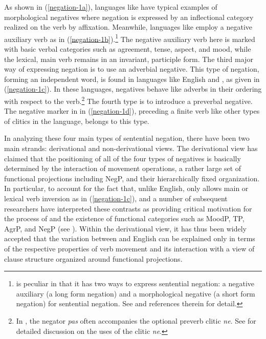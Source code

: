 \documentclass[output=paper
	        ,collection
	        ,collectionchapter
 	        ,biblatex
                ,babelshorthands
                ,newtxmath
                ,draftmode
                ,colorlinks, citecolor=brown
]{langscibook}
\begin{document}
\noindent
As shown in (\ref{negation-1a}), languages like 
have typical examples of morphological negatives where
negation is expressed by an inflectional category realized on the
verb by affixation. Meanwhile, languages like 
 employ a negative auxiliary verb as in (\ref{negation-1b}).\footnote{
 is peculiar in that it has two ways to
 express sentential negation: a negative auxiliary (a long form
 negation)  and a morphological negative (a short form negation)
 for sentential negation. See \citet{Kim:00,Kim:16} and references therein for detail.}
  The negative auxiliary
 verb here is marked with basic verbal categories such as agreement, tense, aspect, and mood, while the lexical, main verb remains in an invariant, participle form. The third major way of expressing negation is to use an adverbial
negative. This type of negation, forming an independent word, is found in
languages like English and , as given in (\ref{negation-1c}). In these languages, negatives behave like adverbs in their ordering with respect to the verb.\footnote{In , the negator \emph{pas}
often accompanies the optional preverb clitic \emph{ne}. See \citet{Godard:2004} for detailed discussion on the uses of the clitic \emph{ne}.} The fourth
type is to introduce a preverbal negative. The negative marker in  in (\ref{negation-1d}), preceding a finite verb like other types of clitics in the language,
belongs to this type.


In analyzing these four main types of sentential negation, there have been two main strands: derivational and non-derivational views. The derivational view has claimed that the positioning of all of the
four types of negatives is basically determined by the interaction of movement
operations, a rather large set of functional projections including NegP,
and their hierarchically fixed organization.
In particular, to account for the
fact that, unlike English, only  allows main or lexical verb inversion
as in (\ref{negation-1c}), \citet{Pollock:89,Pollock:94} and a number of subsequent researchers
have interpreted these contrasts as providing critical motivation for
the process of  and the existence of functional
categories such as MoodP, TP, AgrP, and NegP (see \citealt{Belletti:90, Zanuttini:97,Chomsky:91,Chomsky:93,Lasnik:95, Haegeman:95,Haegeman:97, Vikner97a-u, Zanuttini:2001, Zeijlstra:15}).
Within the derivational view, it has thus been widely
accepted that the variation between  and English can be explained only in terms of the respective properties of verb movement and its interaction with a view of clause
structure organized around functional projections.
\end{document}
